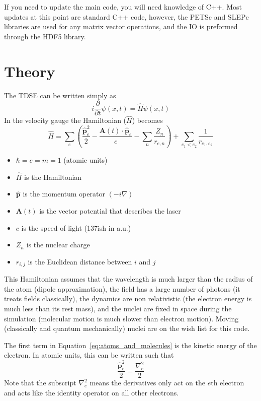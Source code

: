 \documentclass{article}
\begin{document}
If you need to update the main code, you will need knowledge of C++. Most updates at this point are standard C++ code, however, the PETSc and SLEPc libraries are used for any matrix vector operations, and the IO is preformed through the HDF5 library.

\section{Theory} %
\label{sec:theory}

The TDSE can be written simply as
\begin{equation}
    i\frac{\partial}{\partial t}\psi(x,t) = \hat{H}\psi(x,t)
\end{equation}
In the velocity gauge the Hamiltonian ($\hat{H}$) becomes
\begin{equation}
    \label{eq:atoms_and_molecules}
    \hat{H} = \sum_{e}\left(\frac{\hat{\mathbf{p}}^2_e}{2} - \frac{\mathbf{A}(t) \cdot \hat{\mathbf{p}}_e}{c} - \sum_{n} \frac{Z_n}{r_{e,n}}\right) + \sum_{e_1 < e_2}\frac{1}{r_{e_1, e_2}}
\end{equation}
\begin{itemize}
    \item $\hbar=e=m=1$ (atomic units)
    \item $\hat{H}$ is the Hamiltonian
    \item $\hat{\mathbf{p}}$ is the momentum operator $(-i\nabla)$
    \item $\mathbf{A}(t)$ is the vector potential that describes the laser
    \item $c$ is the speed of light (137ish in a.u.)
    \item $Z_n$ is the nuclear charge
    \item $r_{i,j}$ is the Euclidean distance between $i$ and $j$
\end{itemize}
This Hamiltonian assumes that the wavelength is much larger than the radius of the atom (dipole approximation), the field has a large number of photons (it treats fields classically), the dynamics are non relativistic (the electron energy is much less than its rest mass), and the nuclei are fixed in space during the simulation (molecular motion is much slower than electron motion). Moving (classically and quantum mechanically) nuclei are on the wish list for this code.

The first term in Equation~\ref{eq:atoms_and_molecules} is the kinetic energy of the electron. In atomic units, this can be written such that
\begin{equation}
  \frac{\hat{\mathbf{p}}^2_e}{2} = \frac{\nabla_e^2}{2}
\end{equation}
Note that the subscript $\nabla_e^2$ means the derivatives only act on the $e$th electron and acts like the identity operator on all other electrons.
\end{document}
